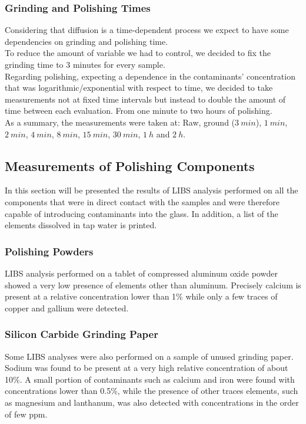 \subsubsection{Grinding and Polishing Times}
\label{subsubsec:grinding_pol_times}
Considering that diffusion is a time-dependent process we expect to have some dependencies on grinding and polishing time.
\\
To reduce the amount of variable we had to control, we decided to fix the grinding time to 3 minutes for every sample.
\\
Regarding polishing, expecting a dependence in the contaminants' concentration that was logarithmic/exponential with respect to time, we decided to take measurements not at fixed time intervals but instead to double the amount of time between each evaluation. From one minute to two hours of polishing.
\\
As a summary, the measurements were taken at: 
Raw, ground ($3\: min$), $1\: min$, $2\: min$, $4\: min$, $8\: min$, $15\: min$, $30\: min$, $1\: h$ and $2\: h$.

\subsection{Measurements of Polishing Components}
\label{subsec:measurements_pol_components}
In this section will be presented the results of LIBS analysis performed on all the components that were in direct contact with the samples and were therefore capable of introducing contaminants into the glass. In addition, a list of the elements dissolved in tap water is printed.

\subsubsection{Polishing Powders}
\label{subsubsec:meas_pol_powders}
LIBS analysis performed on a tablet of compressed aluminum oxide powder showed a very low presence of elements other than aluminum. Precisely calcium is present at a relative concentration lower than 1\% while only a few traces of copper and gallium were detected.

\subsubsection{Silicon Carbide Grinding Paper}
\label{subsubsec:grinding_paper_meas}
Some LIBS analyses were also performed on a sample of unused grinding paper. Sodium was found to be present at a very high relative concentration of about 10\%. A small portion of contaminants such as calcium and iron were found with concentrations lower than 0.5\%, while the presence of other traces elements, such as magnesium and lanthanum, was also detected with concentrations in the order of few ppm.

